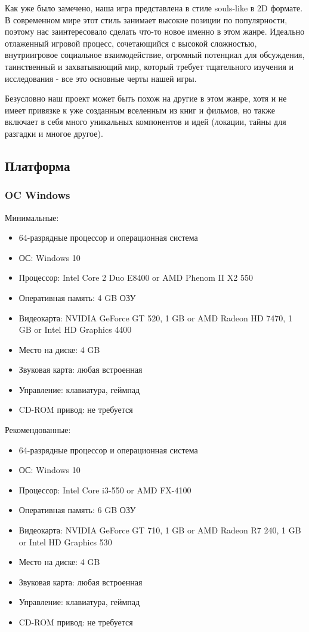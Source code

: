 \documentclass{article}
\begin{document}
Как уже было замечено, наша игра представлена в стиле souls-like в 2D формате. В современном мире этот стиль занимает высокие позиции по популярности, поэтому нас заинтересовало сделать что-то новое именно в этом жанре. Идеально отлаженный игровой процесс, сочетающийся с высокой сложностью, внутриигровое социальное взаимодействие, огромный потенциал для обсуждения, таинственный и захватывающий мир, который требует тщательного изучения и исследования - все это основные черты нашей игры. 

Безусловно наш проект может быть похож на другие в этом жанре, хотя и не имеет привязке к уже созданным вселенным из книг и фильмов, но также включает в себя много уникальных компонентов и идей (локации, тайны для разгадки и многое другое). 

\subsection{Платформа}
\subsubsection{OC Windows}
Минимальные:
\begin{itemize}
    \item 64-разрядные процессор и операционная система
    \item ОС: Windows 10
    \item Процессор: Intel Core 2 Duo E8400 or AMD Phenom II X2 550
    \item Оперативная память: 4 GB ОЗУ
    \item Видеокарта: NVIDIA GeForce GT 520, 1 GB or AMD Radeon HD 7470, 1 GB or Intel HD Graphics 4400
    \item Место на диске: 4 GB
    \item Звуковая карта: любая встроенная
    \item Управление: клавиатура, геймпад
    \item CD-ROM привод: не требуется
\end{itemize}

Рекомендованные:
\begin{itemize}
    \item 64-разрядные процессор и операционная система
    \item ОС: Windows 10
    \item Процессор: Intel Core i3-550 or AMD FX-4100
    \item Оперативная память: 6 GB ОЗУ
    \item Видеокарта: NVIDIA GeForce GT 710, 1 GB or AMD Radeon R7 240, 1 GB or Intel HD Graphics 530
    \item Место на диске: 4 GB
    \item Звуковая карта: любая встроенная
    \item Управление: клавиатура, геймпад
    \item CD-ROM привод: не требуется
\end{itemize}
\end{document}

